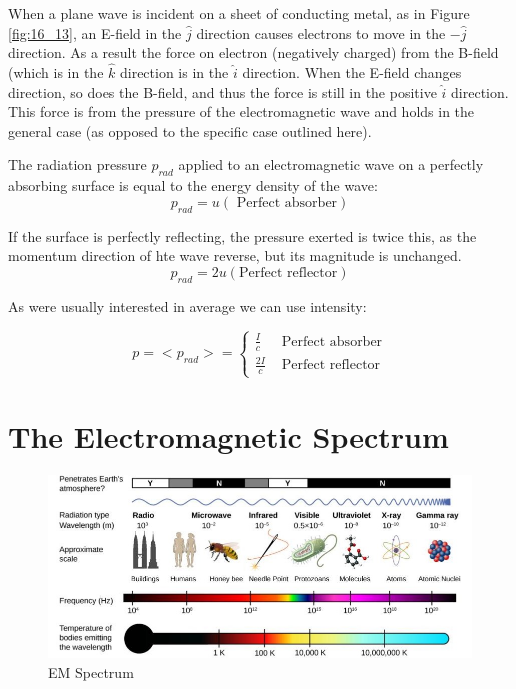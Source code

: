 \documentclass[14pt]{memoir}
\begin{document}
When a plane wave is incident on a sheet of conducting metal, as in Figure \ref{fig:16_13}, an E-field in the $\hat{j}$ direction causes electrons to move in the $-\hat{j}$ direction. As a result the force on electron (negatively charged) from the B-field (which is in the $\hat{k}$ direction is in the $\hat{i}$ direction. When the E-field changes direction, so does the B-field, and thus the force is still in the positive $\hat{i}$ direction. This force is from the pressure of the electromagnetic wave and holds in the general case (as opposed to the specific case outlined here). 

The radiation pressure $p_{rad}$ applied to an electromagnetic wave on a perfectly absorbing surface is equal to the energy density of the wave:
\begin{equation}
p_{rad} = u (\text{ Perfect absorber})
\end{equation}

If the surface is perfectly reflecting, the pressure exerted is twice this, as the momentum direction of hte wave reverse, but its magnitude is unchanged. 
\begin{equation}
p_{rad} = 2u (\text{Perfect reflector})
\end{equation}

As were usually interested in average we can use intensity:

\begin{equation}
p = < p_{rad} > =\begin{cases}
    \frac{I}{c} & \text{ Perfect absorber}\\
    \frac{2I}{c} & \text{ Perfect reflector}
  \end{cases}
\end{equation}


\section{The Electromagnetic Spectrum}


\begin{figure}[H]
\begin{center}
\includegraphics[scale=0.5]{fig/fig_16_17.jpg}
\caption{EM Spectrum}
\label{fig:16_17}
\end{center}
\end{figure}
\end{document}

